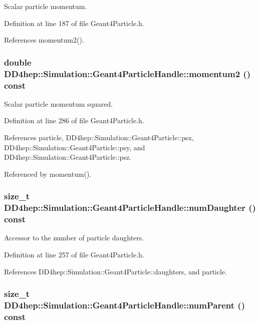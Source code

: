 Scalar particle momentum. 

Definition at line 187 of file Geant4Particle.h.

References momentum2().\hypertarget{class_d_d4hep_1_1_simulation_1_1_geant4_particle_handle_a5c8126955d5ce8941fca779c2b7b4139}{
\subsubsection[{momentum2}]{\setlength{\rightskip}{0pt plus 5cm}double DD4hep::Simulation::Geant4ParticleHandle::momentum2 () const}}
\label{class_d_d4hep_1_1_simulation_1_1_geant4_particle_handle_a5c8126955d5ce8941fca779c2b7b4139}


Scalar particle momentum squared. 

Definition at line 286 of file Geant4Particle.h.

References particle, DD4hep::Simulation::Geant4Particle::psx, DD4hep::Simulation::Geant4Particle::psy, and DD4hep::Simulation::Geant4Particle::psz.

Referenced by momentum().\hypertarget{class_d_d4hep_1_1_simulation_1_1_geant4_particle_handle_a0ad8ec42843f9dca533a3db4049b00c0}{
\subsubsection[{numDaughter}]{\setlength{\rightskip}{0pt plus 5cm}size\_\-t DD4hep::Simulation::Geant4ParticleHandle::numDaughter () const}}
\label{class_d_d4hep_1_1_simulation_1_1_geant4_particle_handle_a0ad8ec42843f9dca533a3db4049b00c0}


Accessor to the number of particle daughters. 

Definition at line 257 of file Geant4Particle.h.

References DD4hep::Simulation::Geant4Particle::daughters, and particle.\hypertarget{class_d_d4hep_1_1_simulation_1_1_geant4_particle_handle_ae68eea3c5bc4250c46597919ef3336d7}{
\subsubsection[{numParent}]{\setlength{\rightskip}{0pt plus 5cm}size\_\-t DD4hep::Simulation::Geant4ParticleHandle::numParent () const}}
\label{class_d_d4hep_1_1_simulation_1_1_geant4_particle_handle_ae68eea3c5bc4250c46597919ef3336d7}


